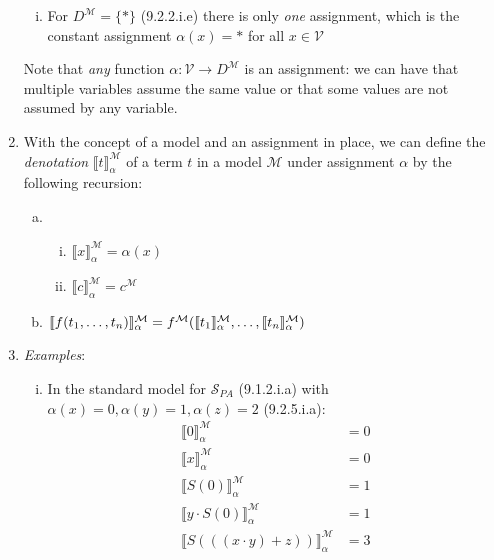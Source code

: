 \begin{enumerate}[\thesection.1]
\begin{enumerate}[(i)]
			\item For $D^\mathcal{M}=\{\ast\}$ (9.2.2.i.e) there is only \emph{one} assignment, which is the constant assignment $\alpha(x)=\ast$ for all $x\in\mathcal{V}$

		\end{enumerate}
		
		
		Note that \emph{any} function $\alpha:\mathcal{V}\to D^\mathcal{M}$ is an assignment: we can have that multiple variables assume the same value or that some values are not assumed by any variable.
		
		\item With the concept of a model and an assignment in place, we can define the \emph{denotation} $\llbracket t\rrbracket_\alpha^\mathcal{M}$ of a term $t$ in a model $\mathcal{M}$ under assignment $\alpha$ by the following recursion:
		
			\begin{enumerate}[(a)]
			
				\item		\begin{enumerate}[(i)]

					\item $\llbracket x\rrbracket_\alpha^\mathcal{M}=\alpha(x)$
					\item $\llbracket c\rrbracket_\alpha^\mathcal{M}=c^\mathcal{M}$
				
				\end{enumerate}
				
				\item $\llbracket f(t_1,\mathellipsis,t_n)\rrbracket_\alpha^\mathcal{M}=f^\mathcal{M}(\llbracket t_1\rrbracket_\alpha^\mathcal{M}, \mathellipsis, \llbracket t_n\rrbracket_\alpha^\mathcal{M})$
			
			\end{enumerate}
			
		\item \emph{Examples}: 
		
		\begin{enumerate}[(i)]
		
			\item In the standard model for $\mathcal{S}_{PA}$ (9.1.2.i.a) with $\alpha(x)=0,\alpha(y)=1,\alpha(z)=2$ (9.2.5.i.a):
			\begin{align*}
			\llbracket 0\rrbracket^\mathcal{M}_\alpha&=0\\
			\llbracket x\rrbracket^\mathcal{M}_\alpha&=0\\
			\llbracket S(0)\rrbracket^\mathcal{M}_\alpha&=1\\
			\llbracket y\cdot S(0)\rrbracket^\mathcal{M}_\alpha&=1\\
			\llbracket S(((x\cdot y)+z))\rrbracket^\mathcal{M}_\alpha&=3
			\end{align*}
			

\end{enumerate}
\end{enumerate}
